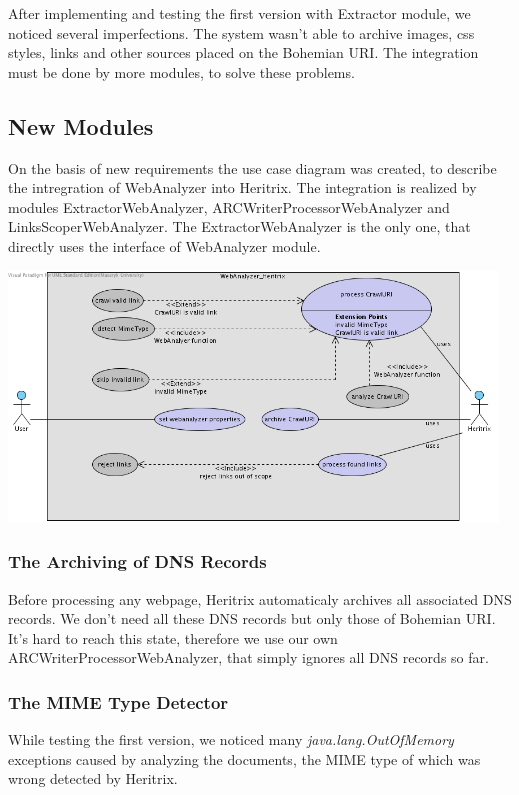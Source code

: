 \documentclass[11pt,a4paper]{article}
\begin{document}
After implementing and testing the first version with Extractor module, we noticed several imperfections. The system wasn't able to archive images, css styles, links and other sources placed on the Bohemian URI. The integration must be done by more modules, to solve these problems.

\subsection{New Modules}
On the basis of new requirements the use case diagram was created, to describe the intregration of WebAnalyzer into Heritrix. The integration is realized by modules ExtractorWebAnalyzer, ARCWriterProcessorWebAnalyzer and LinksScoperWebAnalyzer. The ExtractorWebAnalyzer is the only one, that directly uses the interface of WebAnalyzer module.

\begin{center}
\includegraphics[width=130mm]{usecase1.png}
\end{center}

\subsubsection{The Archiving of DNS Records}
Before processing any webpage, Heritrix automaticaly archives all asso\-cia\-ted DNS records. We don't need all these DNS records but only those of Bohemian URI. It's hard to reach this state, therefore we use our own ARCWriterProcessorWebAnalyzer, that simply ignores all DNS records so far.

\subsubsection{The MIME Type Detector}
While testing the first version, we noticed many \emph{java.lang.OutOfMemory} exceptions caused by analyzing the documents, the MIME type of which was wrong detected by Heritrix.
\end{document}
